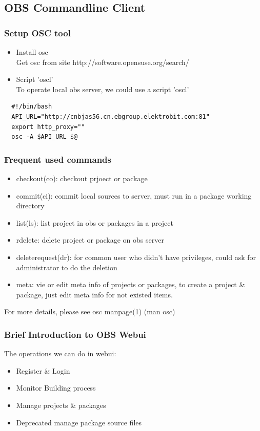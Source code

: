 \documentclass{beamer}
\begin{document}
\subsection{OBS Commandline Client}
\begin{frame}[fragile]
  \frametitle{Setup OSC tool}
  \begin{itemize}
    \item Install osc \\
      Get osc from site http://software.opensuse.org/search/
    \item Script 'oscl' \\
      To operate local obs server, we could use a script 'oscl' 
  \end{itemize}
  \lstset{language=bash}
  \begin{lstlisting}
  #!/bin/bash
  API_URL="http://cnbjas56.cn.ebgroup.elektrobit.com:81"
  export http_proxy="" 
  osc -A $API_URL $@
  \end{lstlisting}
\end{frame}
\begin{frame}
  \frametitle{Frequent used commands}
  \begin{itemize}
    \item checkout(co): checkout prjoect or package
    \item commit(ci): commit local sources to server, must run in a package working directory
    \item list(ls): list project in obs or packages in a project
    \item rdelete: delete project or package on obs server
    \item deleterequest(dr): for common user who didn't have privileges, could ask for administrator to do the deletion
    \item meta: vie or edit meta info of projects or packages, to create a project \& package, just edit meta info for not existed items.
  \end{itemize}
  For more details, please see osc manpage(1) (man osc) 
\end{frame}

\begin{frame}
  \frametitle{Brief Introduction to OBS Webui}
  The operations we can do in webui:\\
  \begin{itemize}
    \item Register \& Login
    \item Monitor Building process
    \item Manage projects \& packages
    \item \alert{Deprecated} manage package source files
  \end{itemize}
\end{frame}
\end{document}
